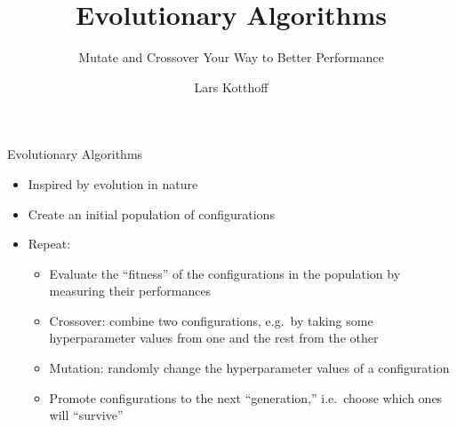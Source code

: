 \documentclass[main]{subfiles}
\begin{document}
\title[AutoML: HPO]{Evolutionary Algorithms}
\subtitle{Mutate and Crossover Your Way to Better Performance}
\author[Lars Kotthoff]{Lars Kotthoff}
\date{}


	
	\maketitle
	

\begin{frame}{Evolutionary Algorithms}
    \begin{itemize}
        \item Inspired by evolution in nature
        \item Create an initial population of configurations
        \item Repeat:
            \begin{itemize}
                \item Evaluate the ``fitness'' of the configurations in the
                    population by measuring their performances
                \item Crossover: combine two configurations, e.g.\ by taking
                    some hyperparameter values from one and the rest from the
                    other
                \item Mutation: randomly change the hyperparameter values of a
                    configuration
                \item Promote configurations to the next ``generation,'' i.e.\
                    choose which ones will ``survive''
            \end{itemize}
    \end{itemize}
\end{frame}

\end{document}
